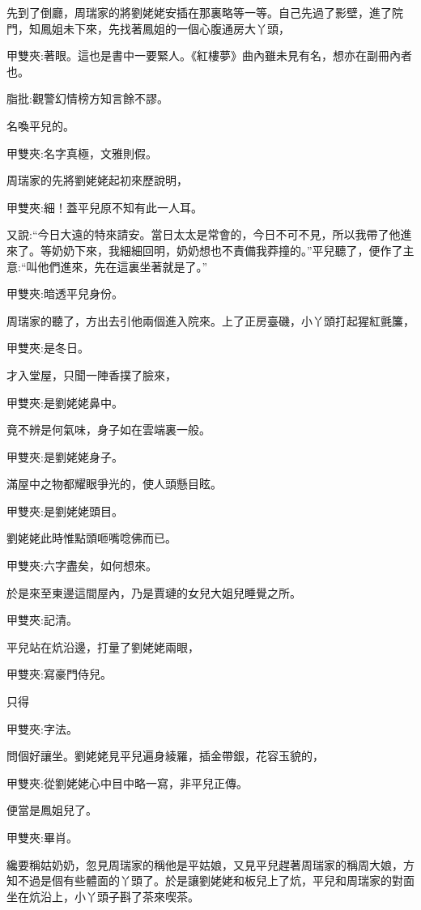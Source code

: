 \begin{parag}
    先到了倒廳，周瑞家的將劉姥姥安插在那裏略等一等。自己先過了影壁，進了院門，知鳳姐未下來，先找著鳳姐的一個心腹通房大丫頭，\begin{note}甲雙夾:著眼。這也是書中一要緊人。《紅樓夢》曲內雖未見有名，想亦在副冊內者也。\end{note}\begin{note}脂批:觀警幻情榜方知言餘不謬。\end{note}名喚平兒的。\begin{note}甲雙夾:名字真極，文雅則假。\end{note}周瑞家的先將劉姥姥起初來歷說明，\begin{note}甲雙夾:細！蓋平兒原不知有此一人耳。\end{note}又說:“今日大遠的特來請安。當日太太是常會的，今日不可不見，所以我帶了他進來了。等奶奶下來，我細細回明，奶奶想也不責備我莽撞的。”平兒聽了，便作了主意:“叫他們進來，先在這裏坐著就是了。”\begin{note}甲雙夾:暗透平兒身份。\end{note}周瑞家的聽了，方出去引他兩個進入院來。上了正房臺磯，小丫頭打起猩紅氈簾，\begin{note}甲雙夾:是冬日。\end{note}才入堂屋，只聞一陣香撲了臉來，\begin{note}甲雙夾:是劉姥姥鼻中。 \end{note}竟不辨是何氣味，身子如在雲端裏一般。\begin{note}甲雙夾:是劉姥姥身子。 \end{note}滿屋中之物都耀眼爭光的，使人頭懸目眩。\begin{note}甲雙夾:是劉姥姥頭目。\end{note}劉姥姥此時惟點頭咂嘴唸佛而已。\begin{note}甲雙夾:六字盡矣，如何想來。\end{note}於是來至東邊這間屋內，乃是賈璉的女兒大姐兒睡覺之所。\begin{note}甲雙夾:記清。\end{note}平兒站在炕沿邊，打量了劉姥姥兩眼，\begin{note}甲雙夾:寫豪門侍兒。\end{note}只得\begin{note}甲雙夾:字法。\end{note}問個好讓坐。劉姥姥見平兒遍身綾羅，插金帶銀，花容玉貌的，\begin{note}甲雙夾:從劉姥姥心中目中略一寫，非平兒正傳。 \end{note}便當是鳳姐兒了。\begin{note}甲雙夾:畢肖。\end{note}纔要稱姑奶奶，忽見周瑞家的稱他是平姑娘，又見平兒趕著周瑞家的稱周大娘，方知不過是個有些體面的丫頭了。於是讓劉姥姥和板兒上了炕，平兒和周瑞家的對面坐在炕沿上，小丫頭子斟了茶來喫茶。
\end{parag}


